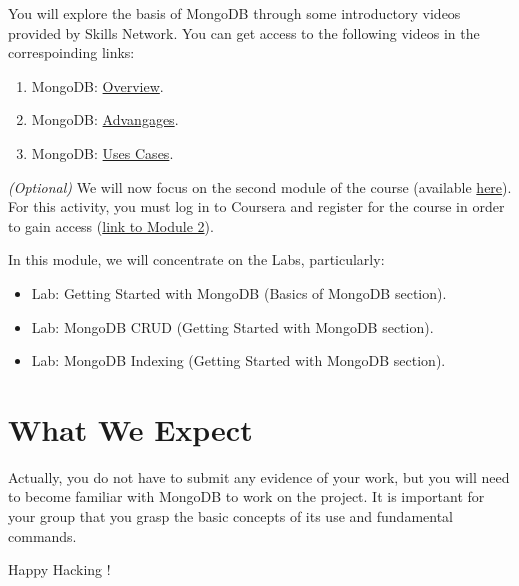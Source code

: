 \documentclass{article}
\begin{document}
You will explore the basis of MongoDB through some introductory videos provided by Skills Network.  You can get access to the following videos in the correspoinding links:

\begin{enumerate}
    \item MongoDB: \href{https://drive.google.com/file/d/1Zy8JrNUHdTJEN1fKGt_WsP9VemwUIoR3/view?usp=drive_link}{Overview}.
    \item MongoDB: \href{https://drive.google.com/file/d/1rxBzyJSaYguZakRydyjWxnxGp4oINfPv/view?usp=drive_link}{Advangages}.
    \item MongoDB: \href{https://drive.google.com/file/d/1mO9VbdRoD7DBIoq_m80_wwoAHwbT8Cn9/view?usp=drive_link}{Uses Cases}.
\end{enumerate}


\textit{(Optional)} We will now focus on the second module of the course (available \href{https://www.coursera.org/learn/introduction-to-nosql-databases}{here}). For this activity, you must log in to Coursera and register for the course in order to gain access (\href{https://www.coursera.org/learn/introduction-to-nosql-databases/home/module/2}{link to Module 2}).

In this module, we will concentrate on the Labs, particularly:

\begin{itemize}
    \item Lab: Getting Started with MongoDB (Basics of MongoDB section).
    \item Lab: MongoDB CRUD (Getting Started with MongoDB section).
    \item Lab: MongoDB Indexing (Getting Started with MongoDB section).
\end{itemize}

\section{What We Expect}
Actually, you do not have to submit any evidence of your work, but you will need to become familiar with MongoDB to work on the project. It is important for your group that you grasp the basic concepts of its use and fundamental commands.

\vspace{5mm}
Happy Hacking !
\end{document}

